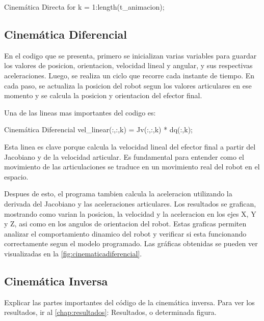 \begin{matlabcode}{Cinemática Directa}
	for k = 1:length(t_animacion);
\end{matlabcode}


\subsection{Cinemática Diferencial}

En el codigo que se presenta, primero se inicializan varias variables para guardar los valores de posicion, orientacion, velocidad lineal y angular, y sus respectivas aceleraciones. Luego, se realiza un ciclo que recorre cada instante de tiempo. En cada paso, se actualiza la posicion del robot segun los valores articulares en ese momento y se calcula la posicion y orientacion del efector final.

Una de las lineas mas importantes del codigo es:
\begin{matlabcode}{Cinemática Diferencial}
	vel_linear(:,:,k) = Jv(:,:,k) * dq(:,k);
\end{matlabcode}

Esta linea es clave porque calcula la velocidad lineal del efector final a partir del Jacobiano y de la velocidad articular. Es fundamental para entender como el movimiento de las articulaciones se traduce en un movimiento real del robot en el espacio.

Despues de esto, el programa tambien calcula la aceleracion utilizando la derivada del Jacobiano y las aceleraciones articulares. Los resultados se grafican, mostrando como varian la posicion, la velocidad y la aceleracion en los ejes X, Y y Z, asi como en los angulos de orientacion del robot. Estas graficas permiten analizar el comportamiento dinamico del robot y verificar si esta funcionando correctamente segun el modelo programado. Las gráficas obtenidas se pueden ver visualizadas en la  \autoref{fig:cinematicadiferencial}.

\subsection{Cinemática Inversa}
Explicar las partes importantes del código de la cinemática inversa.
Para ver los resultados, ir al \autoref{chap:resultados}: Resultados, o determinada figura.
